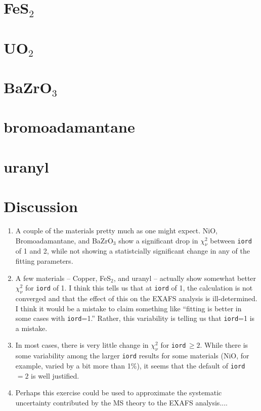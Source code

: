 \documentclass{article}
\begin{document}
\small

\normalsize

\section{FeS$_2$}

\small

\normalsize

\section{UO$_2$}

\scriptsize

\normalsize

\section{BaZrO$_3$}

\scriptsize

\normalsize

\section{bromoadamantane}

\small

\normalsize

\section{uranyl}

\small

\normalsize

\section{Discussion}

\begin{enumerate}
\item A couple of the materials pretty much as one might expect.
  NiO, Bromoadamantane, and BaZrO$_3$ show a significant drop in
  $\chi_\nu^2$ between \texttt{iord} of 1 and 2, while not showing a
  statistcially significant change in any of the fitting parameters.
\item A few materials -- Copper, FeS$_2$, and uranyl -- actually show
  somewhat better $\chi_\nu^2$ for \texttt{iord} of 1.  I think this
  tells us that at \texttt{iord} of 1, the calculation is not
  converged and that the effect of this on the EXAFS analysis is
  ill-determined.  I think it would be a mistake to claim something
  like ``fitting is better in some cases with \texttt{iord}=1.''
  Rather, this variability is telling us that \texttt{iord}=1 is a
  mistake.
\item In most cases, there is very little change in $\chi_\nu^2$ for
  \texttt{iord}\,$\ge2$.  While there is some variability among the
  larger \texttt{iord} results for some materials (NiO, for example,
  varied by a bit more than 1\%), it seems that the default of
  \texttt{iord}\,$=2$ is well justified.
\item Perhaps this exercise could be used to approximate the
  systematic uncertainty contributed by the MS theory to the EXAFS
  analysis....
\end{enumerate}
\end{document}
